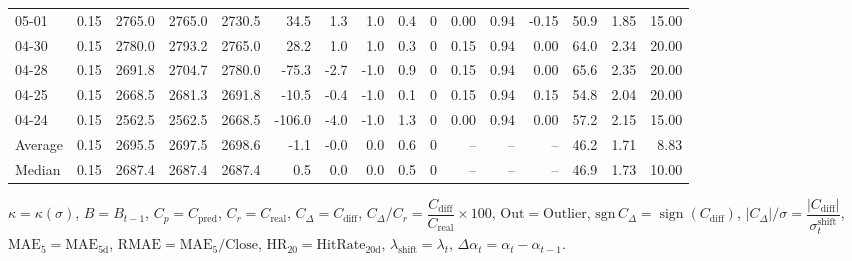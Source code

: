 \begin{threeparttable}
{\begin{tabular}{lrrrrrrrrrrrrrrr}
  05-01 &     0.15 & 2765.0 & 2765.0 & 2730.5 &       34.5 &            1.3 &                      1.0 &                 0.4 &              0 &       0.00 &      0.94 &          -0.15 &             50.9 &            1.85 &                  15.00 \\
  04-30 &     0.15 & 2780.0 & 2793.2 & 2765.0 &       28.2 &            1.0 &                      1.0 &                 0.3 &              0 &       0.15 &      0.94 &           0.00 &             64.0 &            2.34 &                  20.00 \\
  04-28 &     0.15 & 2691.8 & 2704.7 & 2780.0 &      -75.3 &           -2.7 &                     -1.0 &                 0.9 &              0 &       0.15 &      0.94 &           0.00 &             65.6 &            2.35 &                  20.00 \\
  04-25 &     0.15 & 2668.5 & 2681.3 & 2691.8 &      -10.5 &           -0.4 &                     -1.0 &                 0.1 &              0 &       0.15 &      0.94 &           0.15 &             54.8 &            2.04 &                  20.00 \\
  04-24 &     0.15 & 2562.5 & 2562.5 & 2668.5 &     -106.0 &           -4.0 &                     -1.0 &                 1.3 &              0 &       0.00 &      0.94 &           0.00 &             57.2 &            2.15 &                  15.00 \\
Average &     0.15 & 2695.5 & 2697.5 & 2698.6 &       -1.1 &           -0.0 &                      0.0 &                 0.6 &              0 &         -- &        -- &             -- &             46.2 &            1.71 &                   8.83 \\
 Median &     0.15 & 2687.4 & 2687.4 & 2687.4 &        0.5 &            0.0 &                      0.0 &                 0.5 &              0 &         -- &        -- &             -- &             46.9 &            1.73 &                  10.00 \\
\bottomrule
\end{tabular}
}
\begin{tablenotes}\footnotesize
\item $\kappa=\kappa(\sigma)$, $B=B_{t-1}$, $C_p=C_{\text{pred}}$, $C_r=C_{\text{real}}$, $C_\Delta=C_{\text{diff}}$, $C_\Delta/C_r=\dfrac{C_{\text{diff}}}{C_{\text{real}}}\times100$, $\mathrm{Out}=\text{Outlier}$, $\mathrm{sgn}\,C_\Delta=\operatorname{sign}(C_{\text{diff}})$, $|C_\Delta|/\sigma=\dfrac{|C_{\text{diff}}|}{\sigma_t^{\text{shift}}}$, $\mathrm{MAE}_5=\mathrm{MAE}_{5\text{d}}$, $\mathrm{RMAE}= \mathrm{MAE}_5 / \text{Close}$, $\mathrm{HR}_{20}=\mathrm{HitRate}_{20\text{d}}$, 
$\lambda_{\text{shift}}=\lambda_t$, 
$\Delta\alpha_t=\alpha_t-\alpha_{t-1}$.
\end{tablenotes}
\end{threeparttable}
\endgroup

